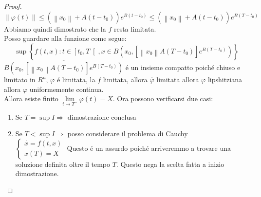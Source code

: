 \begin{proof}
	$$\left\|\varphi(t)\right\|\le\left(\left\|x_0\right\|+A(t-t_0)\right)e^{B(t-t_0)}\le\left(\left\|x_0\right\|+A(t-t_0)\right)e^{B(T-t_0)}$$	
	Abbiamo quindi dimostrato che la $f$ resta limitata.\\
	Posso guardare alla funzione come segue:\\
	$$
	\sup
	\left\{f(t,x): t\in\left[t_0,T\right[, x\in \overline{B\left(x_0,
		\left[ 
			\left\|x_0\right\| A \left(T-t_0\right)
		\right]e^{B\left(T-t_0\right)}\right)}
	\right\}
	$$
	$\overline{B\left(x_0,
		\left[ 
		\left\|x_0\right\| A \left(T-t_0\right)
		\right]e^{B\left(T-t_0\right)}\right)}
	$ \'e un insieme compatto poich\'e chiuso e limitato in $R^n$, $\varphi$ \'e limitata, la $f$ limitata, allora $\overset{\cdot}{\varphi}$ limitata allora $\varphi$ lipshitziana allora $\varphi$ uniformemente continua.\\
		Allora esiste finito $\lim\limits_{t\to T^{-}}\varphi(t)=X$. Ora possono verificarsi due casi:\\
	\begin{enumerate}
		\item Se $T=\sup I \Rightarrow$ dimostrazione conclusa
		\item Se $T<\sup I \Rightarrow$ posso considerare il problema di Cauchy \\
		$\left\{ \begin{matrix} \overset{\cdot}{x}=f(t,x)\\x(T)=X \end{matrix} \right.$ Questo \'e un assurdo poich\'e arriveremmo a trovare una soluzione definita oltre il tempo $T$. Questo nega la scelta fatta a inizio dimostrazione.
		\end{enumerate}
\end{proof}
